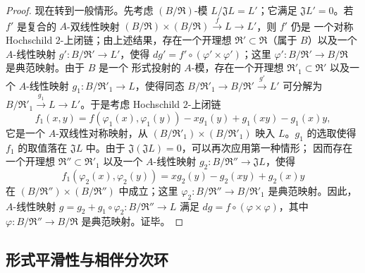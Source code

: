 \begin{proof}
现在转到一般情形。先考虑 $(B/\mathfrak R)$-模
$L/\mathfrak JL=L'$；它满足 $\mathfrak JL'=0$。若 $f'$ 是复合的
$A$-双线性映射
$(B/\mathfrak R)\times(B/\mathfrak R)\xrightarrow{f}L\to L'$，则 $f'$ 仍是
一个对称 Hochschild $2$-上闭链；由上述结果，存在一个开理想
$\mathfrak R'\subset\mathfrak R$（属于 $B$）以及一个 $A$-线性映射
$g':B/\mathfrak R'\to L'$，使得
$dg'=f'\circ(\varphi'\times\varphi')$；这里
$\varphi':B/\mathfrak R'\to B/\mathfrak R$ 是典范映射。由于 $B$ 是一个
形式投射的 $A$-模，存在一个开理想
$\mathfrak R'_1\subset\mathfrak R'$ 以及一个 $A$-线性映射
$g_1:B/\mathfrak R'_1\to L$，使得同态
$B/\mathfrak R'_1\to B/\mathfrak R'\xrightarrow{g'}L'$ 可分解为
$B/\mathfrak R'_1\xrightarrow{g_1}L\to L'$。于是考虑 Hochschild
$2$-上闭链
\[
  f_1(x,y)=f(\varphi_1(x),\varphi_1(y))-xg_1(y)+g_1(xy)-g_1(x)y,
\]
它是一个 $A$-双线性对称映射，从
$(B/\mathfrak R'_1)\times(B/\mathfrak R'_1)$ 映入 $L$。$g_1$ 的选取使得 $f_1$ 的取值落在
$\mathfrak JL$ 中。由于 $\mathfrak J(\mathfrak JL)=0$，可以再次应用第一种情形；
因而存在一个开理想 $\mathfrak R''\subset\mathfrak R'_1$ 以及一个
$A$-线性映射 $g_2:B/\mathfrak R''\to\mathfrak JL$，使得
\[
  f_1(\varphi_2(x),\varphi_2(y))=xg_2(y)-g_2(xy)+g_2(x)y
\]
在 $(B/\mathfrak R'')\times(B/\mathfrak R'')$ 中成立；这里
$\varphi_2:B/\mathfrak R''\to B/\mathfrak R'_1$ 是典范映射。因此，
$A$-线性映射 $g=g_2+g_1\circ\varphi_2:B/\mathfrak R''\to L$ 满足
$dg=f\circ(\varphi\times\varphi)$，其中
$\varphi:B/\mathfrak R''\to B/\mathfrak R$ 是典范映射。证毕。
\end{proof}

\subsection{形式平滑性与相伴分次环}
\label{subsection:0.19.5-fr}

